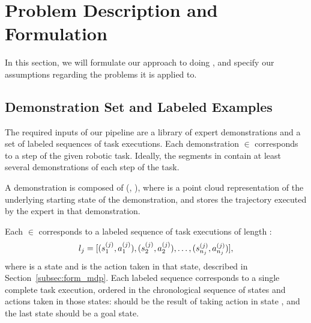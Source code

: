 \section{Problem Description and Formulation}
\label{sec:formulation}
%

In this section, we will formulate our approach to doing \mmql{}, and
specify our assumptions regarding the problems it is applied to.




\subsection{Demonstration Set and Labeled Examples}

The required inputs of our pipeline are a library \demoset{}
of expert demonstrations and a set  of labeled sequences of
task executions.
Each demonstration \demovar{} $\in$ \demoset{} corresponds to a step
of the given robotic task. Ideally, the segments in \demoset{} contain
at least several demonstrations of each step of the task.

A demonstration \demovar{} is composed of (, ),
where  is a point cloud representation of the underlying
starting state of the demonstration, and  stores
the trajectory executed by the expert in that demonstration.

Each  $\in$ 
corresponds to a labeled sequence of
task executions of length :
\begin{equation*}
l_{j} = [(s_{1}^{(j)}, a_{1}^{(j)}),
(s_{2}^{(j)}, a_{2}^{(j)}), \ldots, (s_{n_{j}}^{(j)}, a_{n_{j}}^{(j)})],
\end{equation*}
where 
is a state and  is the action taken in that state, described in
Section~\ref{subsec:form_mdp}. Each labeled sequence  corresponds
to a single complete task execution, ordered in the chronological sequence of
states and actions taken in those states:  should
be the result of taking action  in state ,
and the last state  should be a goal state.

